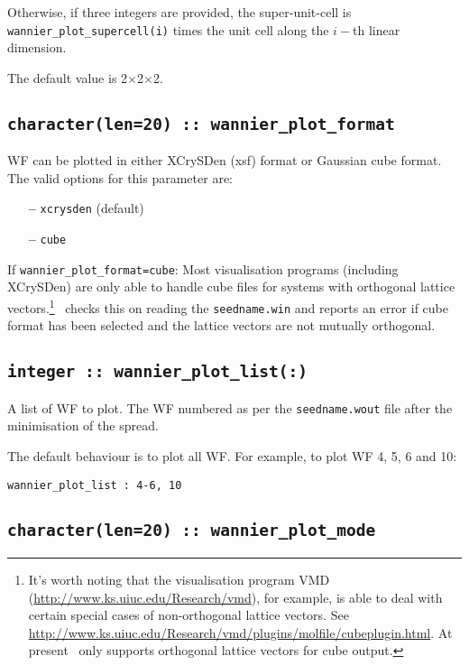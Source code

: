 Otherwise, if three integers are
provided, the super-unit-cell is \verb#wannier_plot_supercell(i)#
times the unit cell along the $i-$th linear dimension.

The default value is 2$\times$2$\times$2.

\subsection[wannier\_plot\_format]{\tt character(len=20) :: wannier\_plot\_format}

WF can be plotted in either XCrySDen (xsf) format or Gaussian cube
format. The valid options for this parameter are:
\begin{itemize}
\item[{\bf --}] \verb#xcrysden# (default)
\item[{\bf --}] \verb#cube#
\end{itemize}

If {\tt wannier\_plot\_format=cube}: Most visualisation programs
(including XCrySDen) are only able to handle cube files for systems
with orthogonal lattice vectors.\footnote{It's worth noting that the
  visualisation program VMD (\url{http://www.ks.uiuc.edu/Research/vmd}), for example, is able to
  deal with certain special cases of non-orthogonal lattice
  vectors. See \url{http://www.ks.uiuc.edu/Research/vmd/plugins/molfile/cubeplugin.html}.
    At present \wannier\ only supports orthogonal lattice vectors for cube output.}  
\wannier\ checks this on reading the {\tt seedname.win} and reports an
error if cube format has been selected and the lattice vectors are not
mutually orthogonal.

\subsection[wannier\_plot\_list]{\tt integer :: wannier\_plot\_list(:)}

 A list of WF to plot. The WF numbered
 as per the {\tt seedname.wout} file after the minimisation of the
 spread. 

 The default behaviour is to plot all WF. For example,
 to plot WF 4, 5, 6 and 10:

 \verb#wannier_plot_list : 4-6, 10#


\subsection[wannier\_plot\_mode]{\tt character(len=20) :: wannier\_plot\_mode}


